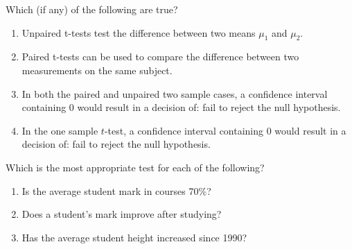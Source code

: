 \documentclass[xcolor=svgnames, 10pt, handout]{beamer}
\begin{document}
\begin{frame}[fragile]
\begin{question}
Which (if any) of the following are true?
\begin{enumerate}
\item Unpaired t-tests test the difference between two means $\mu_1$ and $\mu_2$.
\item Paired t-tests can be used to compare the difference between two measurements on the same subject.
\item In both the paired and unpaired two sample cases, a confidence interval containing 0 would result in a decision of: fail to reject the null hypothesis.
\item  In the one sample $t$-test, a confidence interval containing 0 would result in a decision of: fail to reject the null hypothesis.
\end{enumerate}
\end{question}
\end{frame}


\begin{frame}[fragile]\small
\begin{question}
Which is the most appropriate test for each of the following?
\begin{enumerate}
\item Is the average student mark in courses 70\%?  
\item Does a student's mark improve after studying?  
\item Has the average student height increased since 1990?  
\end{enumerate}
\end{question}
\end{frame}
\end{document}
